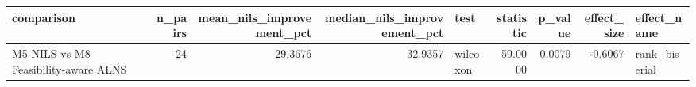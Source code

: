 \begin{tabular}{lrrrlrrrl}
\toprule
comparison & n_pairs & mean_nils_improvement_pct & median_nils_improvement_pct & test & statistic & p_value & effect_size & effect_name \\
\midrule
M5 NILS vs M8 Feasibility-aware ALNS & 24 & 29.3676 & 32.9357 & wilcoxon & 59.0000 & 0.0079 & -0.6067 & rank_biserial \\
\bottomrule
\end{tabular}
